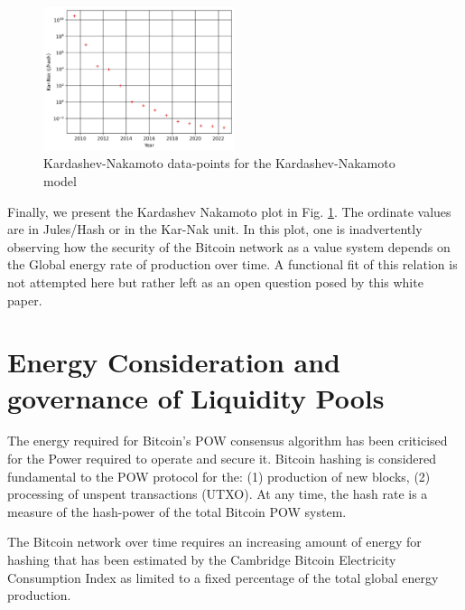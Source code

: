 \documentclass[final,5p,times,twocolumn,authoryear]{elsarticle}
\begin{document}
\begin{figure}
    \centering
    \includegraphics[width=0.50\textwidth]{figs/figkarnak.jpg}
    \caption{Kardashev-Nakamoto data-points for the Kardashev-Nakamoto model}
    \label{fig:karnak}

\end{figure}

Finally, we present the Kardashev Nakamoto plot in Fig. \ref{fig:karnak}. The ordinate values are in Jules/Hash or in the Kar-Nak unit. In this plot, one is inadvertently observing how the security of the Bitcoin network as a value system depends on the Global energy rate of production over time. A functional fit of this relation is not attempted here but rather left as an open question posed by this white paper.

\section{Energy Consideration and governance of Liquidity Pools}
\label{sec:btc4}

The energy required for Bitcoin's POW consensus algorithm has been criticised for the Power required to operate and secure it. Bitcoin hashing is considered fundamental to the POW protocol for the: (1) production of new blocks, (2) processing of unspent transactions (UTXO). At any time, the hash rate is a measure of the hash-power of the total Bitcoin POW system. 

The Bitcoin network over time requires an increasing amount of energy for hashing that has been estimated by the Cambridge Bitcoin Electricity Consumption Index as limited to a fixed percentage of the total global energy production. 
\end{document}
